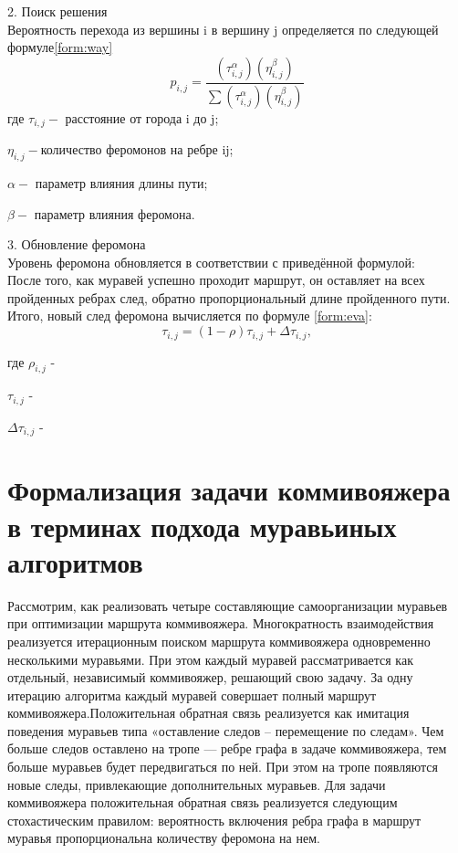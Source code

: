 \documentclass[12pt]{report}
\begin{document}
2. Поиск решения  \\
 Вероятность перехода из вершины i в вершину j определяется по следующей формуле\ref{form:way}\\   
\begin{equation}\label{form:way} 
 p_{i,j}={\frac {(\tau_{i,j}^{\alpha })(\eta_{i,j}^{\beta })}{\sum (\tau_{i,j}^{\alpha })(\eta_{i,j}^{\beta })}}
 \end{equation}
    где \quad$ \tau_{i,j} - $ расстояние от города i до j;
    
         $\eta_{i,j} - $количество феромонов на ребре ij;
         
          $\alpha - $ параметр влияния длины пути;
          
          $\beta - $ параметр влияния феромона.


3. Обновление феромона \\
  Уровень феромона обновляется в соответствии с приведённой формулой:\\
После того, как муравей успешно проходит маршрут, он оставляет на всех пройденных ребрах след, обратно пропорциональный длине пройденного пути. Итого, новый след феромона вычисляется по формуле \ref{form:eva}:
\begin{equation}\label{form:eva} 
    \tau_{i,j}=(1-\rho )\tau_{i,j}+\Delta \tau_{i,j},
\end{equation}

где \quad$ \rho_{i,j}$ -  

    $\tau_{i,j}$ -  
    
    $\Delta \tau_{i,j}$ - 


\section{Формализация задачи коммивояжера в терминах подхода муравьиных алгоритмов}
Рассмотрим, как реализовать четыре составляющие самоорганизации муравьев при оптимизации маршрута коммивояжера. Многократность взаимодействия реализуется итерационным поиском маршрута коммивояжера одновременно несколькими муравьями. При этом каждый муравей рассматривается как отдельный, независимый коммивояжер, решающий свою задачу. За одну итерацию алгоритма каждый муравей совершает полный маршрут коммивояжера.Положительная обратная связь реализуется как имитация поведения муравьев типа «оставление следов – перемещение по следам». Чем больше следов оставлено на тропе — ребре графа в задаче коммивояжера, тем больше муравьев будет передвигаться по ней. При этом на тропе появляются новые следы, привлекающие дополнительных муравьев. Для задачи коммивояжера положительная обратная связь реализуется следующим стохастическим правилом: вероятность включения ребра графа в маршрут муравья пропорциональна количеству феромона на нем.
		
\end{document}
